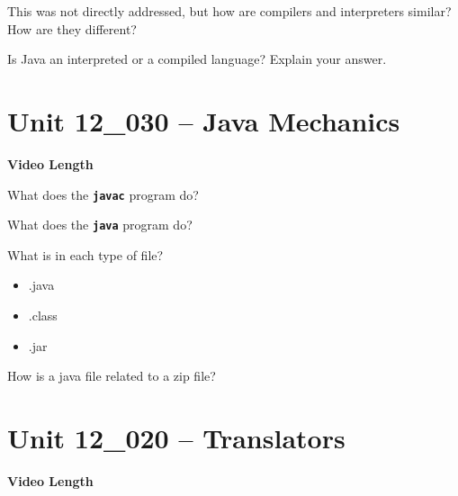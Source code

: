 \documentclass[letterpaper,12pt]{exam}
\newcommand{\unit}{Unit 12}
\begin{document}
\begin{questions}
\begin{samepage}
    \question This was not directly addressed, but how are compilers and interpreters similar?  How are they different?
    \vspace{15mm}
\end{samepage}

\begin{samepage}
    \question Is Java an interpreted or a compiled language?  Explain your answer.
    \vspace{15mm}
\end{samepage}


\section*{\unit\_030 -- Java Mechanics} 
\par{\selectfont\textbf{Video Length }}

\begin{samepage}
    \question What does the \texttt{\textbf{javac}} program do?
    \vspace{5mm}
\end{samepage}

\begin{samepage}
    \question What does the \texttt{\textbf{java}} program do?
    \vspace{5mm}
\end{samepage}
\begin{samepage}
    \question What is in each type of file?
      \begin{itemize}
        \item .java
        \vspace{5mm}
        \item .class
        \vspace{5mm}
        \item .jar
        \vspace{5mm}
       \end{itemize}
\end{samepage}

\begin{samepage}
    \question How is a java file related to a zip file?
    \vspace{5mm}
\end{samepage}

\section*{\unit\_020 -- Translators} 
\par{\selectfont\textbf{Video Length }}


\end{questions}
\end{document}
